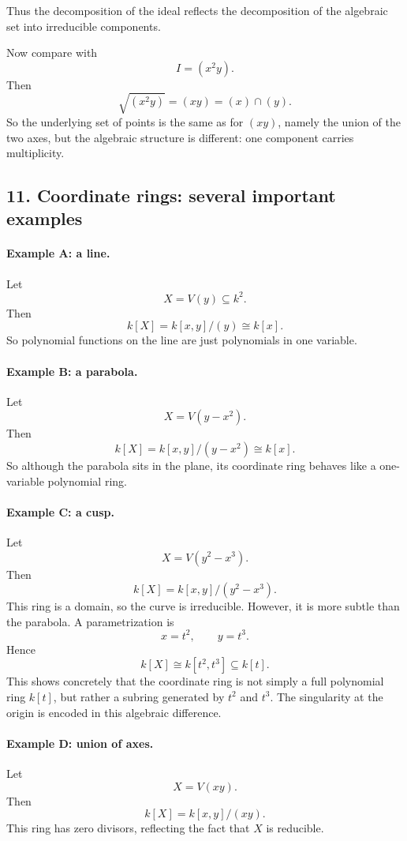 \documentclass[12pt,a4paper]{article}
\theoremstyle{plain}
\theoremstyle{definition}      %
\begin{document}
	Thus the decomposition of the ideal reflects the decomposition of the algebraic set into irreducible components.
	
	\medskip
	
	Now compare with
	\[
	I=(x^2y).
	\]
	Then
	\[
	\sqrt{(x^2y)}=(xy)=(x)\cap (y).
	\]
	So the underlying set of points is the same as for \((xy)\), namely the union of the two axes, but the algebraic structure is different: one component carries multiplicity.
	
	\subsection*{11. Coordinate rings: several important examples}
	
	\paragraph{Example A: a line.}
	Let
	\[
	X=V(y)\subseteq k^2.
	\]
	Then
	\[
	k[X]=k[x,y]/(y)\cong k[x].
	\]
	So polynomial functions on the line are just polynomials in one variable.
	
	\paragraph{Example B: a parabola.}
	Let
	\[
	X=V(y-x^2).
	\]
	Then
	\[
	k[X]=k[x,y]/(y-x^2)\cong k[x].
	\]
	So although the parabola sits in the plane, its coordinate ring behaves like a one-variable polynomial ring.
	
	\paragraph{Example C: a cusp.}
	Let
	\[
	X=V(y^2-x^3).
	\]
	Then
	\[
	k[X]=k[x,y]/(y^2-x^3).
	\]
	This ring is a domain, so the curve is irreducible. However, it is more subtle than the parabola. A parametrization is
	\[
	x=t^2, \qquad y=t^3.
	\]
	Hence
	\[
	k[X]\cong k[t^2,t^3]\subseteq k[t].
	\]
	This shows concretely that the coordinate ring is not simply a full polynomial ring \(k[t]\), but rather a subring generated by \(t^2\) and \(t^3\). The singularity at the origin is encoded in this algebraic difference.
	
	\paragraph{Example D: union of axes.}
	Let
	\[
	X=V(xy).
	\]
	Then
	\[
	k[X]=k[x,y]/(xy).
	\]
	This ring has zero divisors, reflecting the fact that \(X\) is reducible.
	
\end{document}

